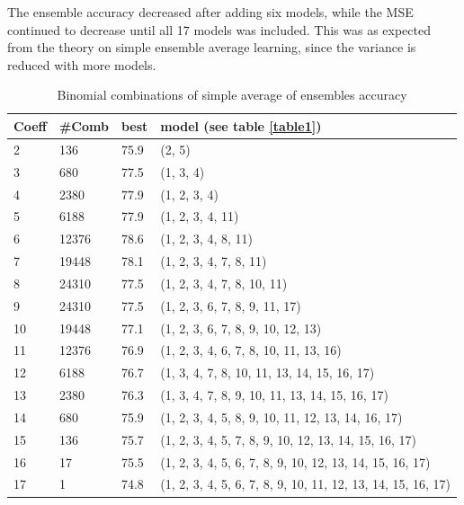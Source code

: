 \documentclass[10pt,letterpaper]{article}
\begin{document}
The ensemble accuracy decreased after adding six models, while the
MSE continued to decrease until all 17 models was included.
This was as expected from the theory on simple ensemble average learning,
since the variance is reduced with more models.

\begin{center}
\begin{table}[hbt!]
\caption{Binomial combinations of simple average of ensembles accuracy}
\begin{tabular}{ |l|l|l|l| }
\hline
Coeff & \#Comb & best & model (see table \ref{table1}) \\ \hline
2 & 136 &    75.9 & (2, 5) \\ \hline
3 & 680 &    77.5 & (1, 3, 4) \\ \hline
4 & 2380 &   77.9 & (1, 2, 3, 4) \\ \hline
5 & 6188 &   77.9 & (1, 2, 3, 4, 11) \\ \hline
6 & 12376 &  78.6 & (1, 2, 3, 4, 8, 11) \\ \hline
7 & 19448 &  78.1 & (1, 2, 3, 4, 7, 8, 11) \\ \hline
8 & 24310 &  77.5 & (1, 2, 3, 4, 7, 8, 10, 11) \\ \hline
9 & 24310 &  77.5 & (1, 2, 3, 6, 7, 8, 9, 11, 17) \\ \hline
10 & 19448 & 77.1 & (1, 2, 3, 6, 7, 8, 9, 10, 12, 13) \\ \hline
11 & 12376 & 76.9 & (1, 2, 3, 4, 6, 7, 8, 10, 11, 13, 16) \\ \hline
12 & 6188 &  76.7 & (1, 3, 4, 7, 8, 10, 11, 13, 14, 15, 16, 17) \\ \hline
13 & 2380 &  76.3 & (1, 3, 4, 7, 8, 9, 10, 11, 13, 14, 15, 16, 17) \\ \hline
14 & 680 &   75.9 & (1, 2, 3, 4, 5, 8, 9, 10, 11, 12, 13, 14, 16, 17) \\ \hline
15 & 136 &   75.7 & (1, 2, 3, 4, 5, 7, 8, 9, 10, 12, 13, 14, 15, 16, 17) \\ \hline
16 & 17 &    75.5 & (1, 2, 3, 4, 5, 6, 7, 8, 9, 10, 12, 13, 14, 15, 16, 17) \\ \hline
17 & 1 &     74.8 & (1, 2, 3, 4, 5, 6, 7, 8, 9, 10, 11, 12, 13, 14, 15, 16, 17) \\ \hline
\end{tabular}
\label{table6}
\end{table}
\end{center}
\end{document}
